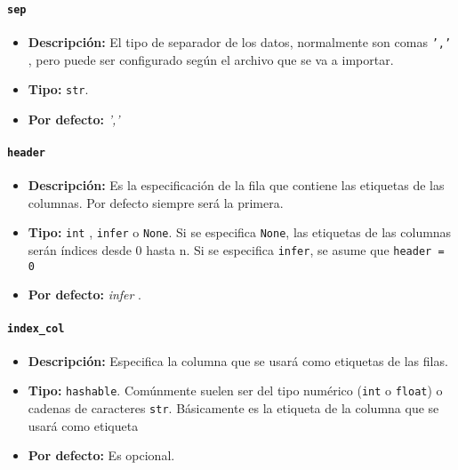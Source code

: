                 \paragraph{\texttt{sep}}

                    \begin{itemize}
                        \item \textbf{Descripción:} El tipo de separador de los datos, normalmente son comas \texttt{','} , pero puede ser configurado según el archivo que se va a importar.
                        \item \textbf{Tipo:} \texttt{str}.
                        \item \textbf{Por defecto:} \textit{','}
                    \end{itemize}

                \paragraph{\texttt{header}}

                    \begin{itemize}
                        \item \textbf{Descripción:} Es la especificación de la fila que contiene las etiquetas de las columnas. Por defecto siempre será la primera.
                        \item \textbf{Tipo:} \texttt{int} , \texttt{infer} o \texttt{None}. Si se especifica \texttt{None}, las etiquetas de las columnas serán índices desde 0 hasta n. Si se especifica \texttt{infer}, se asume que  \texttt{header = 0}
                        \item \textbf{Por defecto:} \textit{infer} .
                    \end{itemize}

                \paragraph{\texttt{index\_col}}

                    \begin{itemize}
                        \item \textbf{Descripción:} Especifica la columna que se usará como etiquetas de las filas.
                        \item \textbf{Tipo:} \texttt{hashable}. Comúnmente suelen ser del tipo numérico (\texttt{int} o \texttt{float}) o cadenas de caracteres \texttt{str}. Básicamente es la etiqueta de la columna que se usará como etiqueta
                        \item \textbf{Por defecto:}  Es opcional.
                    \end{itemize}

